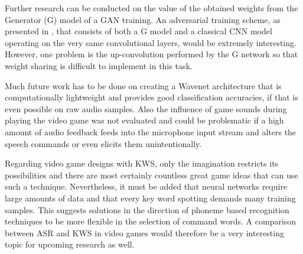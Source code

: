Further research can be conducted on the value of the obtained weights from the Generator (G) model of a GAN training. 
An adversarial training scheme, as presented in \cite{Oezdenizci2020}, that consists of both a G model and a classical CNN model operating on the very same convolutional layers, would be extremely interesting. 
However, one problem is the up-convolution performed by the G network so that weight sharing is difficult to implement in this task.

Much future work has to be done on creating a Wavenet architecture that is computationally lightweight and provides good classification accuracies, if that is even possible on raw audio samples.
Also the influence of game sounds during playing the video game was not evaluated and could be problematic if a high amount of audio feedback feeds into the microphone input stream and alters the speech commands or even elicits them unintentionally.

Regarding video game designs with KWS, only the imagination restricts its possibilities and there are most certainly countless great game ideas that can use such a technique.
Nevertheless, it must be added that neural networks require large amounts of data and that every key word spotting demands many training samples.
This suggests solutions in the direction of phoneme based recognition techniques to be more flexible in the selection of command words.
A comparison between ASR and KWS in video games would therefore be a very interesting topic for upcoming research as well.